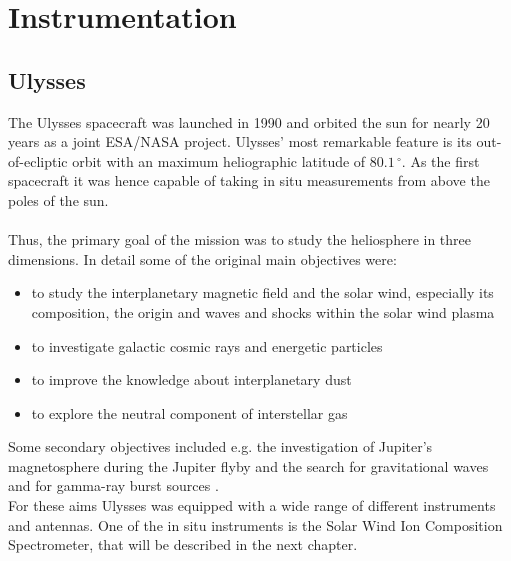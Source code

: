 
\chapter{Instrumentation} %

\label{ChapterInstrumentation} 



\section{Ulysses}
\label{sec:ulysses}
The Ulysses spacecraft \citep{wenzel_ulysses} was launched in 1990 and orbited the sun for nearly 20 years as a joint ESA/NASA project.
Ulysses' most remarkable feature is its out-of-ecliptic orbit with an maximum heliographic latitude of $80.1\,^\circ$.
As the first spacecraft it was hence capable of taking in situ measurements from above the poles of the sun.
\\ \\
Thus, the primary goal of the mission was to study the heliosphere in three dimensions. In detail some of the original main objectives were:
\begin{itemize}
	\item to study the interplanetary magnetic field and the solar wind, especially its composition, the origin and waves and shocks within the solar wind plasma
	\item to investigate galactic cosmic rays and energetic particles
	\item to improve the knowledge about interplanetary dust
	\item to explore the neutral component of interstellar gas
\end{itemize}
Some secondary objectives included e.g. the investigation of Jupiter's magnetosphere during the Jupiter flyby and the search for gravitational waves and for gamma-ray burst sources \citep{wenzel_ulysses}.
\\
For these aims Ulysses was equipped with a wide range of different instruments and antennas. One of the in situ instruments is the Solar Wind Ion Composition Spectrometer, that will be described in the next chapter.
